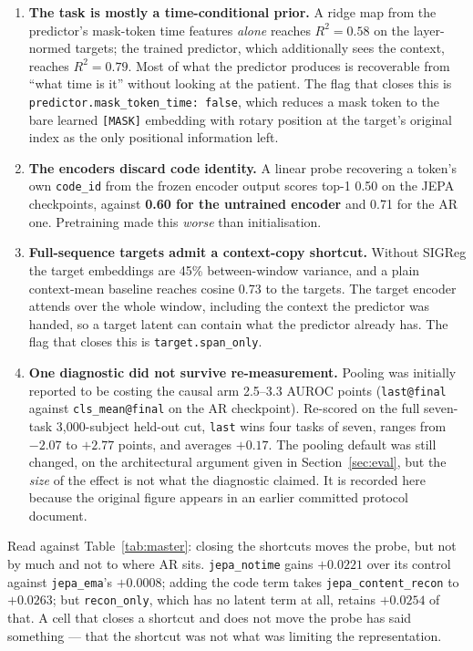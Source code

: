 \documentclass[11pt,a4paper]{article}
\newcommand{\code}[1]{\texttt{\small #1}}
\begin{document}
\begin{enumerate}[leftmargin=*,itemsep=3pt,topsep=3pt]
\item \textbf{The task is mostly a time-conditional prior.} A ridge map from the
      predictor's mask-token time features \emph{alone} reaches $R^2 = 0.58$ on
      the layer-normed targets; the trained predictor, which additionally sees
      the context, reaches $R^2 = 0.79$. Most of what the predictor produces is
      recoverable from ``what time is it'' without looking at the patient. The
      flag that closes this is \code{predictor.mask\_token\_time: false}, which
      reduces a mask token to the bare learned \code{[MASK]} embedding with
      rotary position at the target's original index as the only positional
      information left.
\item \textbf{The encoders discard code identity.} A linear probe recovering a
      token's own \code{code\_id} from the frozen encoder output scores top-1
      0.50 on the JEPA checkpoints, against \textbf{0.60 for the untrained
      encoder} and 0.71 for the AR one. Pretraining made this \emph{worse} than
      initialisation.
\item \textbf{Full-sequence targets admit a context-copy shortcut.} Without
      SIGReg the target embeddings are 45\% between-window variance, and a plain
      context-mean baseline reaches cosine 0.73 to the targets. The target
      encoder attends over the whole window, including the context the predictor
      was handed, so a target latent can contain what the predictor already has.
      The flag that closes this is \code{target.span\_only}.
\item \textbf{One diagnostic did not survive re-measurement.} Pooling was
      initially reported to be costing the causal arm 2.5--3.3 AUROC points
      (\code{last@final} against \code{cls\_mean@final} on the AR checkpoint).
      Re-scored on the full seven-task 3{,}000-subject held-out cut,
      \code{last} wins four tasks of seven, ranges from $-2.07$ to $+2.77$
      points, and averages $+0.17$. The pooling default was still changed, on
      the architectural argument given in Section~\ref{sec:eval}, but the
      \emph{size} of the effect is not what the diagnostic claimed. It is
      recorded here because the original figure appears in an earlier committed
      protocol document.
\end{enumerate}

Read against Table~\ref{tab:master}: closing the shortcuts moves the probe, but
not by much and not to where AR sits. \code{jepa\_notime} gains $+0.0221$ over
its control against \code{jepa\_ema}'s $+0.0008$; adding the code term takes
\code{jepa\_content\_recon} to $+0.0263$; but \code{recon\_only}, which has no
latent term at all, retains $+0.0254$ of that. A cell that closes a shortcut
and does not move the probe has said something --- that the shortcut was not
what was limiting the representation.
\end{document}

